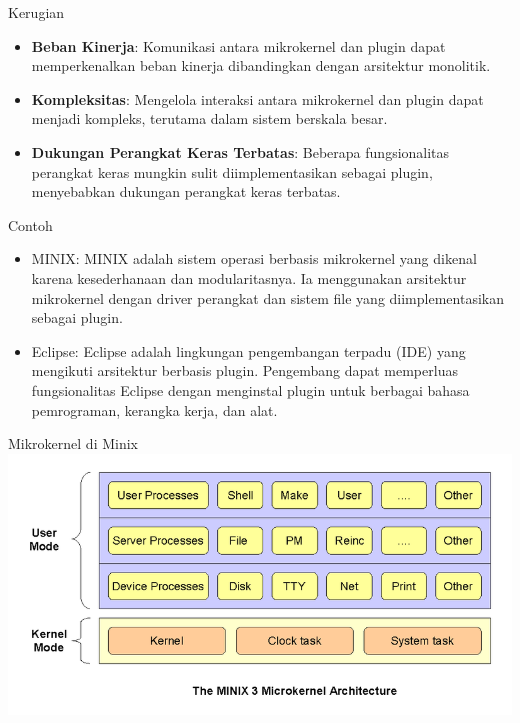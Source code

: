 \documentclass[aspectratio=169, table]{beamer}
\begin{document}
    \begin{frame}{Kerugian}
        \begin{itemize}
            \item \textbf{Beban Kinerja}: Komunikasi antara mikrokernel dan plugin dapat memperkenalkan beban kinerja dibandingkan dengan arsitektur monolitik.
            \item \textbf{Kompleksitas}: Mengelola interaksi antara mikrokernel dan plugin dapat menjadi kompleks, terutama dalam sistem berskala besar.
            \item \textbf{Dukungan Perangkat Keras Terbatas}: Beberapa fungsionalitas perangkat keras mungkin sulit diimplementasikan sebagai plugin, menyebabkan dukungan perangkat keras terbatas.
        \end{itemize}
    \end{frame}

    \begin{frame}{Contoh}
        \begin{itemize}
            \item MINIX: MINIX adalah sistem operasi berbasis mikrokernel yang dikenal karena kesederhanaan dan modularitasnya. Ia menggunakan arsitektur mikrokernel dengan driver perangkat dan sistem file yang diimplementasikan sebagai plugin.
            \item Eclipse: Eclipse adalah lingkungan pengembangan terpadu (IDE) yang mengikuti arsitektur berbasis plugin. Pengembang dapat memperluas fungsionalitas Eclipse dengan menginstal plugin untuk berbagai bahasa pemrograman, kerangka kerja, dan alat.
        \end{itemize}
    \end{frame}

    \begin{frame}{Mikrokernel di Minix}
        \vspace{20pt}
        \centering
        \includegraphics[width=\textwidth]{../../images/microkernel2}
    \end{frame}
\end{document}
